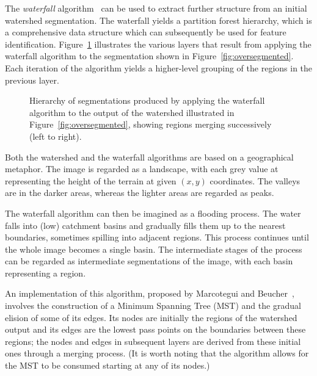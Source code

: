 \documentclass{jfp}
\begin{document}
The {\em waterfall\/} algorithm~\cite{beucher94,marcotegui} can be
used to extract further structure from an initial
watershed segmentation. The waterfall yields a partition forest
hierarchy, which is a comprehensive data structure which can
subsequently be used for feature identification.
Figure~\ref{fig:waterfall} illustrates the various layers that result
from applying the waterfall algorithm to the segmentation shown in
Figure~\ref{fig:oversegmented}.  Each iteration of the algorithm
yields a higher-level grouping of the regions in the previous layer.
\begin{figure}
\centering
\ifpdf
        \hspace{1mm}%
        \hspace{1mm}%
\else
\fi
\caption{Hierarchy of segmentations produced by applying the waterfall
  algorithm to the output of the watershed illustrated in
  Figure~\ref{fig:oversegmented}, showing regions merging successively
  (left to right).}
\label{fig:waterfall}
\end{figure}
Both the watershed and the waterfall algorithms are based on a
geographical metaphor. The image is regarded as a landscape, with each
grey value at representing the height of the terrain at given $(x,y)$
coordinates.
%
The valleys are
in the darker areas, whereas the lighter areas are regarded as peaks.

The waterfall algorithm can then be imagined
as a flooding process. The water falls into (low) catchment basins and
gradually fills them up to the nearest boundaries, sometimes spilling
into adjacent regions. This process continues until the whole image
becomes a single basin. The intermediate stages of the process can be
regarded as intermediate segmentations of the image, with each basin
representing a region.


An implementation of this algorithm, proposed by Marcotegui and
Beucher~\cite{marcotegui}, involves the construction of a Minimum
Spanning Tree (MST) and the gradual elision of some of its edges.  Its
nodes are initially the regions of the watershed output and its edges
are the lowest pass points on the boundaries between these regions;
the nodes and edges in subsequent layers are derived from these
initial ones through a merging process. (It is worth noting that the
algorithm allows for the MST to be consumed starting at any of its
nodes.)
\end{document}
